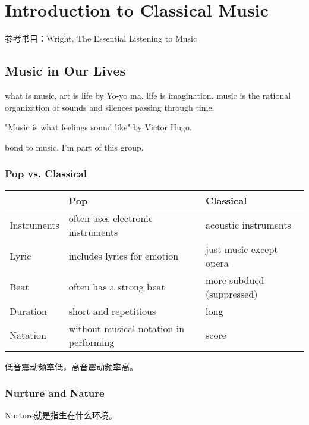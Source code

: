 \section{Introduction to Classical Music}

参考书目：Wright, The Essential Listening to Music

\subsection{Music in Our Lives}
what is music, art is life by Yo-yo ma. life is imagination.
music is the rational organization
of sounds and silences passing
through time.

"Music is what feelings sound like" by Victor Hugo.

bond to music, I'm part of this group.

\subsubsection{Pop vs. Classical}
\begin{tabular}{l|p{4cm}|p{4cm}}\hline
 & Pop & Classical \\ \hline
Instruments & often uses electronic instruments & acoustic instruments  \\ \hline
Lyric & includes lyrics for emotion & just music except opera  \\ \hline
Beat & often has a strong beat & more subdued (suppressed)  \\ \hline
Duration & short and repetitious & 
long  \\ \hline
Natation & without musical notation in performing & score  \\ \hline
\end{tabular}


低音震动频率低，高音震动频率高。

\subsubsection{Nurture and Nature}
Nurture就是指生在什么环境。


